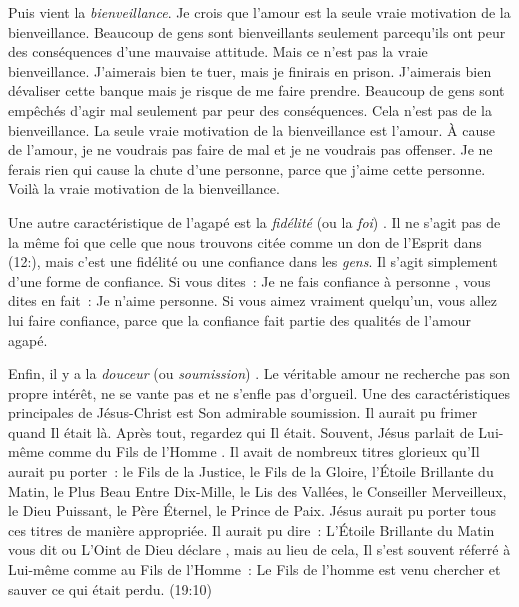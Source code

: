 Puis vient la \emph{bienveillance}. Je crois que l'amour est la seule
 vraie motivation de la bienveillance.
 Beaucoup de gens sont bienveillants seulement parcequ'ils ont peur
 des conséquences d'une mauvaise attitude.
 Mais ce n'est pas la vraie bienveillance.
 \og J'aimerais bien te tuer, mais je finirais en prison. \fg{}
 \og J'aimerais bien dévaliser cette banque mais je risque
 de me faire prendre. \fg{}
 Beaucoup de gens sont empêchés d'agir mal seulement par peur
 des conséquences. Cela n'est pas de la bienveillance.
 La seule vraie motivation de la bienveillance est l'amour.
 À cause de l'amour, je ne voudrais pas faire de mal
 et je ne voudrais pas offenser. Je ne ferais rien qui cause
 la chute d'une personne, parce que j'aime cette personne.
 Voilà la vraie motivation de la bienveillance.

Une autre caractéristique de l'agapé est la \emph{fidélité}
 (ou la \emph{foi})
 .
 Il ne s'agit pas de la même foi que celle que nous trouvons citée
 comme un don de l'Esprit dans (12:),
 mais c'est une fidélité ou une confiance dans les \emph{gens}.
 Il s'agit simplement d'une forme de confiance. Si vous dites~:
 \og Je ne fais confiance à personne \fg{}, vous dites en fait~:
 \og Je n'aime personne. \fg{}
 Si vous aimez vraiment quelqu'un, vous allez lui faire confiance,
 parce que la confiance fait partie des qualités de l'amour agapé.

Enfin, il y a la \emph{douceur} (ou \emph{soumission})
 .
 Le véritable amour ne recherche pas son propre intérêt,
 ne se vante pas et ne s'enfle pas d'orgueil.
 Une des caractéristiques principales de Jésus-Christ
 est Son admirable soumission. Il aurait pu frimer quand Il était là.
 Après tout, regardez qui Il était. Souvent, Jésus parlait de Lui-même
 comme du \og Fils de l'Homme \fg{}.
 Il avait de nombreux titres glorieux qu'Il aurait pu porter~:
 le Fils de la Justice, le Fils de la Gloire, l'Étoile Brillante du Matin,
 le Plus Beau Entre Dix-Mille, le Lis des Vallées,
 le Conseiller Merveilleux, le Dieu Puissant, le Père Éternel,
 le Prince de Paix. Jésus aurait pu porter tous ces titres
 de manière appropriée. Il aurait pu dire~:
 \og L'Étoile Brillante du Matin vous dit \fg{} ou
 \og L'Oint de Dieu déclare \fg{}, mais au lieu de cela,
 Il s'est souvent réferré à Lui-même comme au Fils de l'Homme~:
 \og Le Fils de l'homme est venu chercher et sauver
 ce qui était perdu. \fg{} (19:10)

